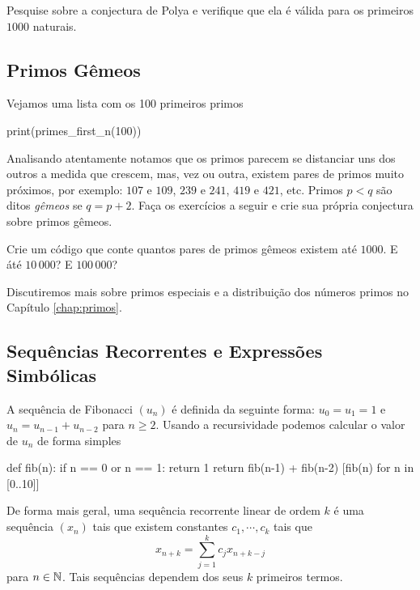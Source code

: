 \begin{exercise}
  Pesquise sobre a conjectura de Polya e verifique que ela é
  válida para os primeiros $1000$ naturais.
\end{exercise}

\subsection{Primos Gêmeos}
Vejamos uma lista com os 100 primeiros primos
\begin{sageinput}
print(primes_first_n(100))                                                                         
\end{sageinput}
\begin{sageoutput}
[2, 3, 5, 7, 11, 13, 17, 19, 23, 29, 31, 37, 41, 43, 47, 53, 59, 61, 67, 71, 73, 79, 83, 89, 97, 101, 103, 107, 109, 113, 127, 131, 137, 139, 149, 151, 157, 163, 167, 173, 179, 181, 191, 193, 197, 199, 211, 223, 227, 229, 233, 239, 241, 251, 257, 263, 269, 271, 277, 281, 283, 293, 307, 311, 313, 317, 331, 337, 347, 349, 353, 359, 367, 373, 379, 383, 389, 397, 401, 409, 419, 421, 431, 433, 439, 443, 449, 457, 461, 463, 467, 479, 487, 491, 499, 503, 509, 521, 523, 541]
\end{sageoutput}
Analisando atentamente notamos que os primos parecem se distanciar
uns dos outros a medida que crescem, mas, vez ou outra, existem pares de primos
muito próximos, por exemplo: $107$ e $109$, $239$ e $241$, $419$ e $421$, etc. 
Primos $p<q$ são ditos \emph{gêmeos} se $q = p+2$.
Faça
os exercícios a seguir e crie sua própria conjectura sobre primos gêmeos.

\begin{exercise}
  Crie um código que conte quantos pares de primos gêmeos existem
  até $1000$. E áté $10\,000$? E $100\,000$?
\end{exercise}

Discutiremos mais sobre primos especiais
e a distribuição dos números primos no Capítulo \ref{chap:primos}.

\subsection{Sequências Recorrentes e Expressões Simbólicas}
\label{par:fib}
A sequência de Fibonacci $(u_n)$ é definida da seguinte forma:
$u_0 = u_1 = 1$ e $u_{n} = u_{n-1} + u_{n-2}$ para $n\geq 2$.
Usando a recursividade podemos calcular o valor de $u_n$ de
forma simples
\begin{sageinput}
def fib(n):
  if n == 0 or n == 1:
    return 1
  return fib(n-1) + fib(n-2)
[fib(n) for n in [0..10]]
\end{sageinput}
\begin{sageoutput}
[1, 1, 2, 3, 5, 8, 13, 21, 34, 55, 89]
\end{sageoutput}
De forma mais geral, uma sequência recorrente linear
de ordem $k$ é uma sequência $(x_n)$ tais que existem
constantes $c_1,\cdots,c_k$ tais que
$$
  x_{n+k} = \sum_{j = 1}^k c_j x_{n+k-j}
$$
para $n \in \mathbb{N}$. Tais sequências dependem dos seus $k$
primeiros termos.

